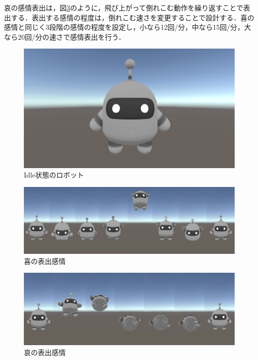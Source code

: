 哀の感情表出は，図\ref{sad}のように，飛び上がって倒れこむ動作を繰り返すことで表出する．表出する感情の程度は，倒れこむ速さを変更することで設計する．喜の感情と同じく3段階の感情の程度を設定し，小なら12回/分，中なら15回/分，大なら20回/分の速さで感情表出を行う．


\vspace{1cm}
 \begin{figure}[!h]
 \begin{center}
  \centering
  \includegraphics[width=12cm]{images/chapter3/Idle.eps}
  \caption{Idle状態のロボット}
  \label{Idle}
 \end{center}
\end{figure}

\vspace{1cm}
 \begin{figure}[!h]
 \begin{center}
  \centering
  \includegraphics[width=12cm]{images/chapter3/happy.eps}
  \caption{喜の表出感情}
  \label{happy}
 \end{center}
\end{figure}

\vspace{1cm}
 \begin{figure}[!h]
 \begin{center}
  \centering
  \includegraphics[width=12cm]{images/chapter3/sad.eps}
  \caption{哀の表出感情}
  \label{sad}
 \end{center}
\end{figure}

\newpage


















